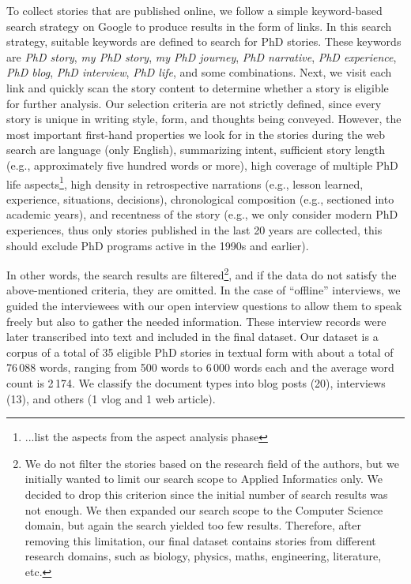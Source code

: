 \documentclass{kerauth}
\begin{document}
To collect stories that are published online, we follow a simple keyword-based search strategy on Google to produce results in the form of links. In this search strategy, suitable keywords are defined to search for PhD stories. These keywords are \textit{PhD story}, \textit{my PhD story}, \textit{my PhD journey}, \textit{PhD narrative}, \textit{PhD experience}, \textit{PhD blog}, \textit{PhD interview}, \textit{PhD life}, and some combinations. Next, we visit each link and quickly scan the story content to determine whether a story is eligible for further analysis. Our selection criteria are not strictly defined, since every story is unique in writing style, form, and thoughts being conveyed. However, the most important first-hand properties we look for in the stories during the web search are language (only English), summarizing intent, sufficient story length (e.g., approximately five hundred words or more), high coverage of multiple PhD life aspects\footnote{...list the aspects from the aspect analysis phase}, high density in retrospective narrations (e.g., lesson learned, experience, situations, decisions), chronological composition (e.g., sectioned into academic years), and recentness of the story (e.g., we only consider modern PhD experiences, thus only stories published in the last 20 years are collected, this should exclude PhD programs active in the 1990s and earlier).

In other words, the search results are filtered\footnote{We do not filter the stories based on the research field of the authors, but we initially wanted to limit our search scope to Applied Informatics only. We decided to drop this criterion since the initial number of search results was not enough. We then expanded our search scope to the Computer Science domain, but again the search yielded too few results. Therefore, after removing this limitation, our final dataset contains stories from different research domains, such as biology, physics, maths, engineering, literature, etc.}, and if the data do not satisfy the above-mentioned criteria, they are omitted. In the case of ``offline'' interviews, we guided the interviewees with our open interview questions to allow them to speak freely but also to gather the needed information. These interview records were later transcribed into text and included in the final dataset. Our dataset is a corpus of a total of 35 eligible PhD stories in textual form with about a total of 76\,088 words, ranging from 500 words to 6\,000 words each and the average word count is 2\,174. We classify the document types into blog posts (20), interviews (13), and others (1 vlog and 1 web article).
\end{document}
